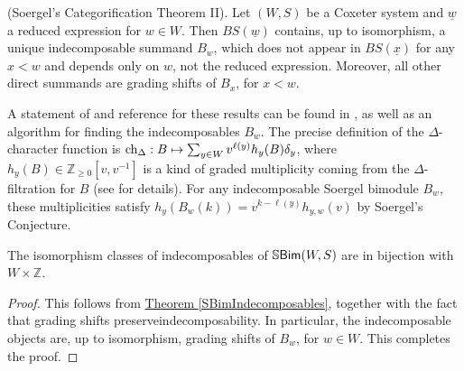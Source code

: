 \noindent\begin{theorem}\textup{(Soergel's Categorification Theorem II).}\label{SBimIndecomposables} Let $(W, S)$ be a Coxeter system and $\underline{w}$ a reduced expression for $w \in W$. Then $BS(\underline{w})$ contains, up to isomorphism, a unique indecomposable summand $B_w$, which does not appear in $BS(\underline{x})$ for any $x < w$ and depends only on $w$, not the reduced expression. Moreover, all other direct summands are grading shifts of $B_x$, for $x < w$.\newpage
\end{theorem}

\noindent A statement of and reference for these results can be found in \cite[Theorem 5.24]{EMTW20}, as well as an algorithm for finding the indecomposables $B_w$. The precise definition of the $\Delta$-character function is %
$\textup{ch}_\Delta : B \mapsto \sum_{y \in W} v^{\ell(y)} h_y(B) \delta_y$, where $h_y(B) \in \mathbb{Z}_{\geq 0}[v, v^{-1}]$ is a kind of graded multiplicity coming from the $\Delta$-filtration for $B$ (see \cite[Theorem 5.10]{EMTW20} for details). For any indecomposable Soergel bimodule $B_w$, these multiplicities satisfy $h_y(B_w(k)) = v^{k-\ell(y)} h_{y, w}(v)$ by Soergel's Conjecture.\\

\noindent\begin{corollary}\label{SBimIndecomposablesCardinality} The isomorphism classes of indecomposables of $\mathbb{S}\textnormal{\textsf{Bim}}(W, S)$ are in bijection with $W \times \mathbb{Z}$.\\
\end{corollary}

\noindent\begin{proof} This follows from \hyperref[SBimIndecomposables]{Theorem \ref*{SBimIndecomposables}}, together with the fact that grading shifts preserve\linebreak indecomposability. In particular, the indecomposable objects are, up to isomorphism, grading shifts of $B_w$, for $w \in W$. This completes the proof.
\end{proof}\\


